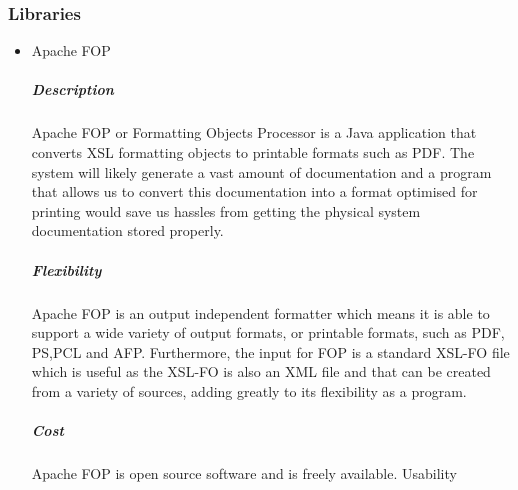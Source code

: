 \documentclass[a4paper,10pt]{article}
\begin{document}
\subsubsection{Libraries}
	\begin{itemize}
		\item Apache FOP
				\subparagraph{Description}
				Apache FOP or Formatting Objects Processor is a Java application that converts XSL formatting objects to printable formats such as PDF. The system will likely generate a vast amount of documentation and a program that allows us to convert this documentation into a format optimised for printing would save us hassles from getting the physical system documentation stored properly.
				\subparagraph{Flexibility}
				Apache FOP is an output independent formatter which means it is able to support a wide variety of output formats, or printable formats, such as PDF, PS,PCL and AFP. Furthermore, the input for FOP is a standard XSL-FO file which is useful as the XSL-FO is also an XML file and that can be created from a variety of sources, adding greatly to its flexibility as a program.
				\subparagraph{Cost}
				Apache FOP is open source software and is freely available.
				Usability

	\end{itemize}
\end{document}
